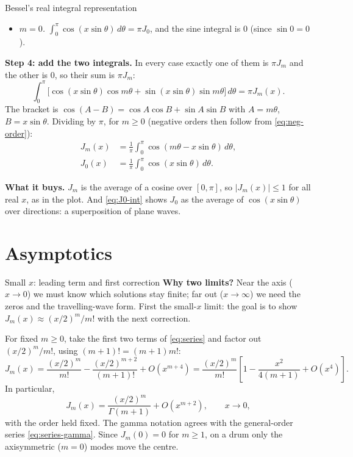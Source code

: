 \documentclass[11pt]{beamer}
\begin{document}
\begin{frame}[allowframebreaks=1.00]{Bessel's real integral representation}
\begin{itemize}
        integral is \(0\).
  \item \emph{\(m=0\).} \(\int_0^\pi\cos(x\sin\theta)\,d\theta=\pi J_0\), and the sine integral is \(0\) (since
        \(\sin0=0\)).
\end{itemize}
\textbf{Step 4: add the two integrals.} In every case exactly one of them is \(\pi J_m\) and the other is \(0\),
so their sum is \(\pi J_m\):
\[
 \int_0^\pi\bigl[\cos(x\sin\theta)\cos m\theta+\sin(x\sin\theta)\sin m\theta\bigr]\,d\theta=\pi J_m(x).
\]
The bracket is \(\cos(A-B)=\cos A\cos B+\sin A\sin B\) with \(A=m\theta\), \(B=x\sin\theta\). Dividing by \(\pi\), for
\(m\ge0\) (negative orders then follow from \eqref{eq:neg-order}):
\begin{align}
 J_m(x)&=\frac1\pi\int_0^\pi\cos(m\theta-x\sin\theta)\,d\theta,
 \label{eq:int-rep}\\
 J_0(x)&=\frac1\pi\int_0^\pi\cos(x\sin\theta)\,d\theta.
 \label{eq:J0-int}
\end{align}

\textbf{What it buys.} $J_m$ is the average of a cosine over $[0,\pi]$, so $|J_m(x)|\le1$ for
all real $x$, as in the plot. And \eqref{eq:J0-int} shows $J_0$ as the average of $\cos(x\sin\theta)$ over
directions: a superposition of plane waves.
\end{frame}





\section{Asymptotics}

\begin{frame}[allowframebreaks=1.00]{Small $x$: leading term and first correction}
\footnotesize
\textbf{Why two limits?} Near the axis ($x\to0$) we must know which solutions stay
finite; far out ($x\to\infty$) we need the zeros and the travelling-wave form.
First the small-$x$ limit: the goal is to show $J_m(x)\approx(x/2)^m/m!$ with the next correction.

For fixed $m\ge0$, take the first two terms of \eqref{eq:series} and factor out
$(x/2)^m/m!$, using $(m+1)!=(m+1)m!$:
\[
 J_m(x)=\frac{(x/2)^m}{m!}-\frac{(x/2)^{m+2}}{(m+1)!}+O(x^{m+4})
 =\frac{(x/2)^m}{m!}\left[1-\frac{x^2}{4(m+1)}+O(x^4)\right].
\]
In particular,
\begin{equation}
 J_m(x)=\frac{(x/2)^m}{\Gamma(m+1)}+O(x^{m+2}),\qquad x\to0,
 \label{eq:smallx}
\end{equation}
with the order held fixed. The gamma notation agrees with the general-order series
\eqref{eq:series-gamma}. Since $J_m(0)=0$ for $m\ge1$, on a drum only the
axisymmetric ($m=0$) modes move the centre.
\end{frame}
\end{document}
